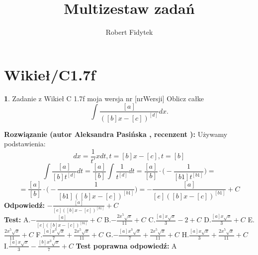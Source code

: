 \documentclass[12pt, a4paper]{article}
\title{Multizestaw zadań}
\author{Robert Fidytek}
\date{}
\theoremstyle{definition} %
\newtheorem{zad}{}
\newcommand{\kategoria}[1]{\section{#1}} %
\newcommand{\zadStart}[1]{\begin{zad}#1\newline} %
\newcommand{\zadStop}{\end{zad}}   %
\newcommand{\rozwStart}[2]{\noindent \textbf{Rozwiązanie (autor #1 , recenzent #2): }\newline} %
\newcommand{\rozwStop}{\newline}                                            %
\newcommand{\odpStart}{\noindent \textbf{Odpowiedź:}\newline}    %
\newcommand{\odpStop}{\newline}                                             %
\newcommand{\testStart}{\noindent \textbf{Test:}\newline} %
\newcommand{\testStop}{\newline} %
\newcommand{\kluczStart}{\noindent \textbf{Test poprawna odpowiedź:}\newline} %
\newcommand{\kluczStop}{\newline} %
\begin{document}
\maketitle


\kategoria{Wikieł/C1.7f}
\zadStart{Zadanie z Wikieł C 1.7f moja wersja nr [nrWersji]}
Oblicz całke $$\int \frac{[a]}{([b]x-[c])^{[d]}}dx.$$
\zadStop
\rozwStart{Aleksandra Pasińska}{}
Używamy podstawienia:
$$dx=\frac{1}{t'}xdt,t=[b]x-[c], t=[b]$$
$$\int \frac{[a]}{[b]t^{[d]}}dt=\frac{[a]}{[b]}\int \frac{1}{t^{[d]}}dt=\frac{[a]}{[b]}\cdot \bigg(-\frac{1}{[b1]t^{[b1]}}\bigg)=$$
$$=\frac{[a]}{[b]}\cdot \bigg(-\frac{1}{[b1]([b]x-[c])^{[b1]}}\bigg)=-\frac{[a]}{[e]([b]x-[c])^{[b1]}}+C$$
\rozwStop
\odpStart
$-\frac{[a]}{[e]([b]x-[c])^{[b1]}}+C$\\
\odpStop
\testStart
A.$-\frac{[a]}{[e]([b]x-[c])^{[b1]}}+C$
B.$-\frac{2x^5\sqrt{x}}{11}+C$
C.$\frac{[a]x\sqrt{x}}{3}-2+C$
D.$\frac{[a]x\sqrt{x}}{3}+C$
E.$\frac{2x^5\sqrt{x}}{11}+C$
F.$\frac{[a]x^3\sqrt{x}}{7}+\frac{2x^5\sqrt{x}}{11}+C$
G.$-\frac{[a]x^3\sqrt{x}}{7}+\frac{2x^5\sqrt{x}}{11}+C$
H.$\frac{[a]x\sqrt{x}}{3}+\frac{2x^5\sqrt{x}}{11}+C$
I.$\frac{[a]x\sqrt{x}}{3}-\frac{[b]x^3\sqrt{x}}{7}+C$
\testStop
\kluczStart
A
\kluczStop
\end{document}
